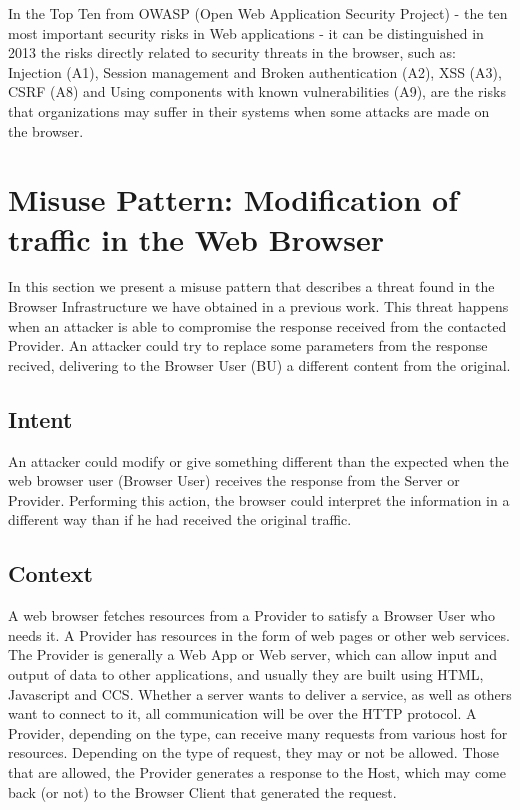 \documentclass{sig-alternate-05-2015}
\begin{document}
In the Top Ten from OWASP \cite{owaspTopTen} (Open Web Application Security Project) - the ten most important security risks in Web applications - it can be distinguished in 2013 the risks directly related to security threats in the browser, such as: Injection (A1), Session management and Broken authentication (A2), XSS (A3), CSRF (A8) and Using components with known vulnerabilities (A9), are the risks that organizations may suffer in their systems when some attacks are made on the browser.


\section{Misuse Pattern: Modification of traffic in the Web Browser}
In this section we present a misuse pattern that describes a threat found in the Browser Infrastructure we have obtained in a previous work. This threat happens when an attacker is able to compromise the response received from the contacted Provider. An attacker could try to replace some parameters from the response recived, delivering to the Browser User (BU) a different content from the original.

\subsection{Intent}
An attacker could modify or give something different than the expected when the web browser user (Browser User) receives the response from the Server or Provider. Performing this action, the browser could interpret the information in a different way than if he had received the original traffic.

\subsection{Context}
A web browser fetches resources from a Provider to satisfy a Browser User who needs it. A Provider has resources in the form of web pages or other web services. The Provider is generally a Web App or Web server, which can allow input and output of data to other applications, and usually they are built using HTML, Javascript and CCS. Whether a server wants to deliver a service, as well as others want to connect to it, all communication will be over the HTTP protocol. A Provider, depending on the type, can receive many requests from various host for resources. Depending on the type of request, they may or not be allowed. Those that are allowed, the Provider generates a response to the Host, which may come back (or not) to the Browser Client that generated the request.
\end{document}
